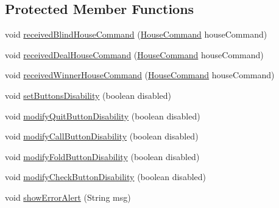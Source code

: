 \subsection*{Protected Member Functions}
\begin{DoxyCompactItemize}
\item 
void \hyperlink{classhu_1_1elte_1_1bfw1p6_1_1poker_1_1client_1_1controller_1_1game_1_1_abstract_main_game_controller_ac0e2a5a2a57cdbb4590c866b25013466}{received\+Blind\+House\+Command} (\hyperlink{classhu_1_1elte_1_1bfw1p6_1_1poker_1_1command_1_1_house_command}{House\+Command} house\+Command)
\item 
void \hyperlink{classhu_1_1elte_1_1bfw1p6_1_1poker_1_1client_1_1controller_1_1game_1_1_abstract_main_game_controller_a41364e0edf8f8dac29def8058b7bebcb}{received\+Deal\+House\+Command} (\hyperlink{classhu_1_1elte_1_1bfw1p6_1_1poker_1_1command_1_1_house_command}{House\+Command} house\+Command)
\item 
void \hyperlink{classhu_1_1elte_1_1bfw1p6_1_1poker_1_1client_1_1controller_1_1game_1_1_abstract_main_game_controller_ac15bae6d71d0e25b29c5ff394eb84c6a}{received\+Winner\+House\+Command} (\hyperlink{classhu_1_1elte_1_1bfw1p6_1_1poker_1_1command_1_1_house_command}{House\+Command} house\+Command)
\item 
void \hyperlink{classhu_1_1elte_1_1bfw1p6_1_1poker_1_1client_1_1controller_1_1game_1_1_abstract_main_game_controller_a23ac5d54455490263e99eb7780ea9615}{set\+Buttons\+Disability} (boolean disabled)
\item 
void \hyperlink{classhu_1_1elte_1_1bfw1p6_1_1poker_1_1client_1_1controller_1_1game_1_1_abstract_main_game_controller_a4e0e828b178b60ac04b475ca7ac1d99b}{modify\+Quit\+Button\+Disability} (boolean disabled)
\item 
void \hyperlink{classhu_1_1elte_1_1bfw1p6_1_1poker_1_1client_1_1controller_1_1game_1_1_abstract_main_game_controller_aee1d3f09eeed4cc909ae587ad1b294a7}{modify\+Call\+Button\+Disability} (boolean disabled)
\item 
void \hyperlink{classhu_1_1elte_1_1bfw1p6_1_1poker_1_1client_1_1controller_1_1game_1_1_abstract_main_game_controller_a4e97186e78a29a870dc2a1ee77e78867}{modify\+Fold\+Button\+Disability} (boolean disabled)
\item 
void \hyperlink{classhu_1_1elte_1_1bfw1p6_1_1poker_1_1client_1_1controller_1_1game_1_1_abstract_main_game_controller_a5b5b001d5a2f9a75cb4c0e915e96e8c6}{modify\+Check\+Button\+Disability} (boolean disabled)
\item 
void \hyperlink{classhu_1_1elte_1_1bfw1p6_1_1poker_1_1client_1_1controller_1_1game_1_1_abstract_main_game_controller_a6a1c807c13945ab7c6043d3e392a0f16}{show\+Error\+Alert} (String msg)

\end{DoxyCompactItemize}
